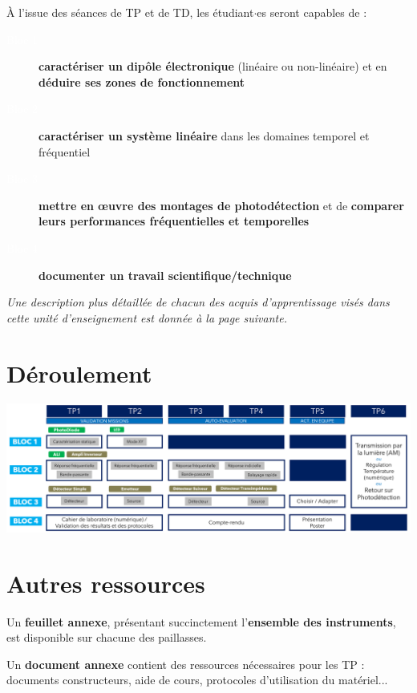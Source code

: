 \documentclass[a4paper,11pt,twoside]{book} %
\begin{document}
{\large À l'issue des séances de TP et de TD, les étudiant$\cdot$es seront capables de :

\begin{description}
	\item[\colorbox{violet_iogs}{\textcolor{white}{Bloc 1}}] \textbf{caractériser un dipôle électronique}
(linéaire ou non-linéaire) et en \textbf{déduire ses zones de fonctionnement}
	\item[\colorbox{violet_iogs}{\textcolor{white}{Bloc 2}}] \textbf{caractériser un système linéaire} dans les domaines temporel et fréquentiel
	\item[\colorbox{violet_iogs}{\textcolor{white}{Bloc 3}}] \textbf{mettre en \oe{}uvre des montages de photodétection} et de \textbf{comparer leurs performances fréquentielles et temporelles}
	\item[\colorbox{violet_iogs}{\textcolor{white}{Bloc 4}}] \textbf{documenter un travail scientifique/technique }
\end{description}

\textit{Une description plus détaillée de chacun des acquis d'apprentissage visés dans cette unité d'enseignement est donnée à la page suivante.}

\section{Déroulement}

\begin{center}
	\includegraphics[width=\textwidth]{images/deroulement_2025.png}
\end{center}

\section{Autres ressources}

Un \textbf{feuillet annexe}, présentant succinctement l'\textbf{ensemble des instruments}, est disponible sur chacune des paillasses.

Un \textbf{document annexe} contient des ressources nécessaires pour les TP : documents constructeurs, aide de cours, protocoles d'utilisation du matériel...

}
\end{document}
